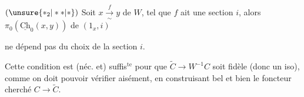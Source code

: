 $(\unsure{\ast_2|\ast\ast|\ast})$ Soit $x\xrightarrow[\sim]{f}y$ de $W$, tel que $f$ ait une  section $i$, alors   $\pi_0(\underline{\mathrm{Ch}}_0(x,y))$  de $(1_x,i)$


ne dépend pas du choix de la section $i$.

Cette condition est (néc. et) suffis$^{\mathrm{te}}$ pour que $\widetilde C\longrightarrow W^{-1}C$ soit fidèle (donc un iso), comme on doit pouvoir vérifier aisément, en construisant bel et bien le foncteur cherché $C\longrightarrow\widetilde C$.

